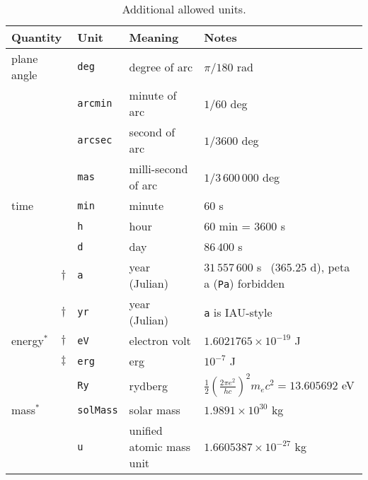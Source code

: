 \documentclass[11pt,makeidx]{book}     %
\begin{document}
\begin{table*}[tbp]
\small
\renewcommand{\arraystretch}{.8}
\tabcolsep 1mm
\caption[Additional allowed units.]{Additional allowed units.}
\begin{center}
\protect\begin{tabular}{lclll}
\hline\hline
\multicolumn{2}{l}{Quantity} &
\multicolumn{1}{l}{Unit} & \multicolumn{1}{l}{Meaning
                        \rule[0mm]{0mm}{3mm}} 
                        & \multicolumn{1}{l}{Notes} \\  \hline
plane angle\rule{0mm}{3mm}
               &      & \verb+deg+      & degree of arc         
                      & $\pi/180$ rad \\
               &      & \verb+arcmin+   & minute of arc
                      & $1/60$ deg \\
               &      & \verb+arcsec+   & second of arc
                      & $1/3600$ deg \\
               &      & \verb+mas+     & milli-second of arc
                      & $1/3\,600\,000$ deg \\
time           &      & \verb+min+        & minute & 60 s \\
               &      & \verb+h+        & hour & 60 min = 3600 s \\
               &      & \verb+d+        & day 
                      & $86\,400$ s\\
               &$\dag$& \verb+a+        & year (Julian)
                      & $31\,557\,600$ s ~(365.25 d), peta a
                       (\verb+Pa+) forbidden\\
               &$\dag$& \verb+yr+        & year (Julian)
                      & \verb+a+ is IAU-style \\
energy$^*$     &$\dag$& \verb+eV+        & electron volt
                      & $1.6021765\times10^{-19}$ J \\
               &$\ddag$& \verb+erg+        & erg
                      & $10^{-7}$ J \\
               &      & \verb+Ry+       & rydberg
                      & $\frac{1}{2}\left(\frac{2\pi e^2}{hc}\right)^2
                          m_ec^2  = 13.605692 $ eV \\
mass$^*$       &      &\verb+solMass+   & solar mass
                      & $1.9891\times10^{30}$ kg \\
               &      &\verb+u+         & unified atomic mass unit
                      &$1.6605387\times10^{-27}$ kg \\

\end{tabular}
\end{center}
\end{table*}
\end{document}
